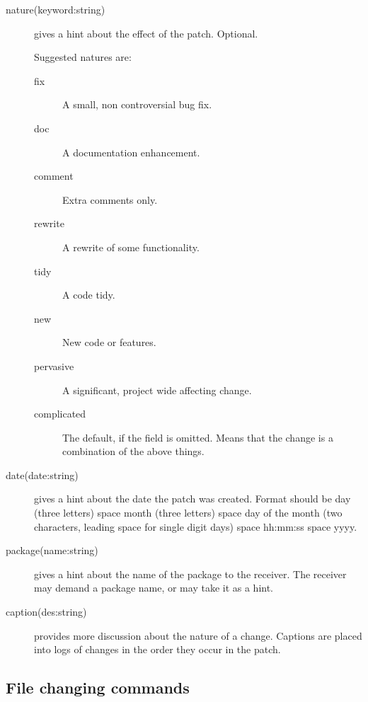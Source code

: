 \documentclass{article}
\begin{document}
\begin{description}
\item[nature(keyword:string)] gives a hint about the effect of the
patch. Optional. 

Suggested natures are:

\begin{description}
\item [fix] A small, non controversial bug fix.
\item [doc] A documentation enhancement.
\item [comment] Extra comments only.
\item [rewrite] A rewrite of some functionality.
\item [tidy] A code tidy.
\item [new] New code or features.
\item [pervasive] A significant, project wide affecting change.
\item [complicated] The default, if the field is omitted. Means that
the change is a combination of the above things.
\end{description}

\item[date(date:string)] gives a hint about the date the patch was
created. Format should be day (three letters) space month (three
letters) space day of the month (two characters, leading space for
single digit days) space  hh:mm:ss space yyyy.

\item[package(name:string)] gives a hint about the name of the package
to the receiver. The receiver may demand a package name, or may take
it as a hint.

\item[caption(des:string)] provides more discussion about the 
nature of a change. Captions are placed into logs of changes in the
order they occur in the patch.

\end{description}

\subsection{File changing commands}
\end{document}
